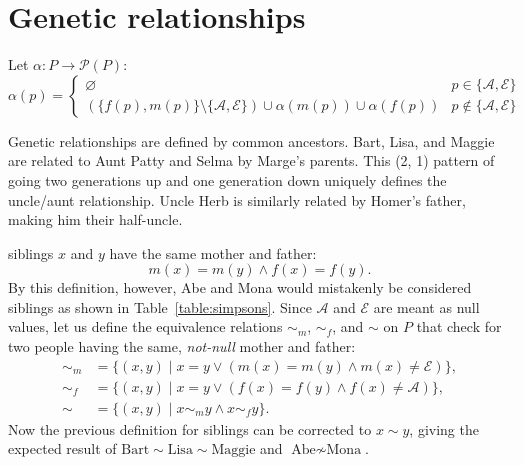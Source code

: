 \documentclass[letterpaper,11pt]{article}
\begin{document}
\section{Genetic relationships}

Let \(\alpha : P \to \mathcal{P}(P)\):
\[
    \alpha(p) = \begin{cases}
        \varnothing                                                                                 & p \in \{\mathcal{A}, \mathcal{E}\}    \\
        (\{f(p), m(p)\} \setminus \{\mathcal{A}, \mathcal{E}\}) \cup \alpha(m(p)) \cup \alpha(f(p)) & p \notin \{\mathcal{A}, \mathcal{E}\}
    \end{cases}
\]

Genetic relationships are defined by common ancestors.
Bart, Lisa, and Maggie are related to Aunt Patty and Selma by Marge's parents.
This (2, 1) pattern of going two generations up and one generation down uniquely defines the uncle/aunt relationship.
Uncle Herb is similarly related by Homer's father, making him their half-uncle.

siblings \(x\) and \(y\) have the same mother and father:
\[
    m(x) = m(y) \land f(x) = f(y).
\]
By this definition, however, Abe and Mona would mistakenly be considered siblings as shown in Table~\ref{table:simpsons}.
Since \(\mathcal{A}\) and \(\mathcal{E}\) are meant as null values, let us define the equivalence relations \({\sim_m}\), \({\sim_f}\), and \({\sim}\) on \(P\) that check for two people having the same, \textit{not-null} mother and father:
\begin{align*}
    {\sim_m} & = \{(x, y) \mid x = y \lor (m(x) = m(y) \land m(x) \neq \mathcal{E})\}, \\
    {\sim_f} & = \{(x, y) \mid x = y \lor (f(x) = f(y) \land f(x) \neq \mathcal{A})\}, \\
    {\sim}   & = \{(x, y) \mid x \sim_m y \land x \sim_f y\}.
\end{align*}
Now the previous definition for siblings can be corrected to \(x \sim y\), giving the expected result of \(\text{Bart} \sim \text{Lisa} \sim \text{Maggie}\) and \(\text{Abe} \nsim \text{Mona}\).
\end{document}
